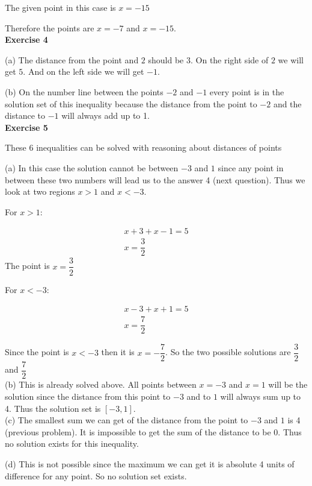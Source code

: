 \documentclass[10pt]{article}
\begin{document}
The given point in this case is $x = -15$

Therefore the points are $x = -7$ and $x = -15$.\\


\textbf{Exercise 4}

(a) The distance from the point and $2$ should be $3$. On the right side of $2$ we will get $5$. And on the left side we will get 
$-1$.

(b) On the number line between the points $-2$ and $-1$ every point is in the solution set of this inequality because 
the distance from the point to $-2$ and the distance to $-1$ will always add up to 1. \\


\textbf{Exercise 5}

These 6 inequalities can be solved with reasoning about distances of points

(a) In this case the solution cannot be between $-3$ and $1$ since any point in between these two numbers will lead us to the answer 4 (next question).
Thus we look at two regions $x > 1$ and $x < -3$.

For $x > 1$:

\begin{gather*}
    x + 3 + x - 1 = 5\\
    x = \dfrac{3}{2}
\end{gather*}
The point is $x = \dfrac{3}{2}$

For $x < -3$:

\begin{gather*}
    x - 3 + x + 1 = 5\\
    x = \dfrac{7}{2}
\end{gather*}

Since the point is $x < -3$ then it is $x = - \dfrac{7}{2}$. So the two possible solutions are $\dfrac{3}{2}$ and $\dfrac{7}{2}$\\

(b) This is already solved above. All points between $x = -3$ and $x = 1$ will be the solution since the distance from this 
point to $-3$ and to $1$ will always sum up to 4. Thus the solution set is $[-3, 1]$.\\

(c) The smallest sum we can get of the distance from the point to $-3$ and $1$ is 4 (previous problem). It is impossible to get the sum 
of the distance to be $0$. Thus no solution exists for this inequality.

(d) This is not possible since the maximum we can get it is absolute 4 units of difference for any point. So no solution set exists.
\end{document}
